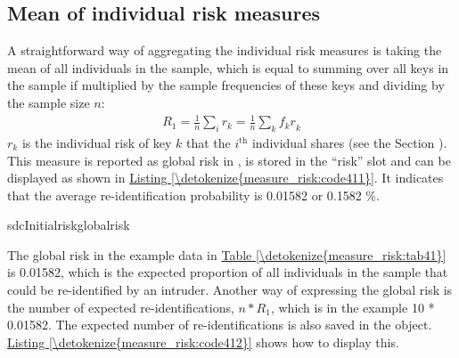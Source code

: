\documentclass[letterpaper,10pt,english]{sphinxmanual}
\begin{document}
\subsection{Mean of individual risk measures}
\label{\detokenize{measure_risk:mean-of-individual-risk-measures}}
A straightforward way of aggregating the individual risk measures is
taking the mean of all individuals in the sample, which is equal to
summing over all keys in the sample if multiplied by the sample
frequencies of these keys and dividing by the sample size \(n\):
\begin{equation*}
\begin{split}R_{1} = \frac{1}{n}\sum_{i}^{}r_{k} = \frac{1}{n}\sum_{k}^{}{f_{k}r}_{k}\end{split}
\end{equation*}
\(r_{k}\) is the individual risk of key \(k\) that the
\(i\)$^{\text{th}}$ individual shares (see the Section
{\hyperref[\detokenize{measure_risk:categorical-key-variables-and-frequency-counts}]{}}).
This measure
is reported as global risk in , is stored in the “risk” slot
and can be displayed as shown in \hyperref[\detokenize{measure_risk:code411}]{Listing \ref{\detokenize{measure_risk:code411}}}. It indicates that the
average re-identification probability is 0.01582 or 0.1582 \%.

\def\sphinxLiteralBlockLabel{\label{\detokenize{measure_risk:code411}}}
%
\begin{sphinxVerbatim}[commandchars=\\\{\},numbers=left,firstnumber=1,stepnumber=1]
 sdcInitialriskglobalrisk
 \PYG{p}{[}\PYG{p}{]} 
\end{sphinxVerbatim}

The global risk in the example data in \hyperref[\detokenize{measure_risk:tab41}]{Table \ref{\detokenize{measure_risk:tab41}}} is 0.01582, which is
the expected proportion of all individuals in the sample that could be
re-identified by an intruder. Another way of expressing the global risk
is the number of expected re-identifications, \(n*R_{1}\), which is
in the example 10 * 0.01582. The expected number of re-identifications
is also saved in the  object. \hyperref[\detokenize{measure_risk:code412}]{Listing \ref{\detokenize{measure_risk:code412}}} shows how to
display this.
\end{document}
